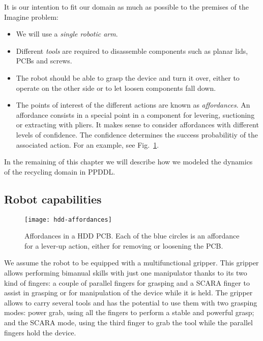 \documentclass[../root.tex]{subfiles}
\begin{document}
It is our intention to fit our domain as much as possible to the
premises of the Imagine problem:
\begin{itemize}
	\item We will use a \emph{single robotic arm}.
	\item Different \emph{tools} are required to disassemble components such as
	planar lids, PCBs and screws.
	\item The robot should be able to grasp the device and turn it over, either
	to operate on the other side or to let loosen components fall down.
	\item The points of interest of the different actions are known as
	\emph{affordances}. An affordance consists in a special point in
	a component for levering, suctioning or extracting with pliers.
	It makes sense to consider affordances with different levels of
	confidence. The confidence determines the success probabilitiy of the
	associated action. For an example, see Fig.~\ref{fig:hdd-affordances}.
\end{itemize}

In the remaining of this chapter we will describe how we modeled 
the dynamics of the recycling domain in PPDDL.

\subsection{Robot capabilities}

\begin{figure}[tbp]
	\centering
	\texttt{[image: hdd-affordances]}
	\caption{Affordances in a HDD PCB. Each of the blue
		circles is an affordance for a lever-up action, either for
		removing or loosening the PCB.}
	\label{fig:hdd-affordances}
\end{figure}

We assume the robot to be equipped with a multifunctional gripper.
This gripper allows performing
bimanual skills with just one manipulator thanks to its two kind
of fingers: a couple of parallel fingers for grasping
and a SCARA finger to assist in grasping or for manipulation of
the device while it is held.
The gripper allows to carry several
tools and has the potential to use them with two grasping modes:
power grab, using all the fingers to perform a stable and powerful grasp;
and the SCARA mode, using the third finger
to grab the tool while the parallel fingers hold the device.
\end{document}
